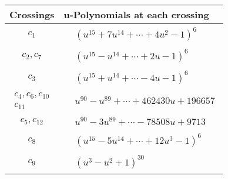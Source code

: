 \documentclass[1p]{elsarticle_modified}
\theoremstyle{definition}
\begin{document}
\begin{tabular}{m{50pt}|m{274pt}}
Crossings & \hspace{64pt}u-Polynomials at each crossing \\
\hline $$\begin{aligned}c_{1}\end{aligned}$$&$\begin{aligned}
&(u^{15}+7 u^{14}+\cdots+4 u^2-1)^{6}
\end{aligned}$\\
\hline $$\begin{aligned}c_{2},c_{7}\end{aligned}$$&$\begin{aligned}
&(u^{15}- u^{14}+\cdots+2 u-1)^{6}
\end{aligned}$\\
\hline $$\begin{aligned}c_{3}\end{aligned}$$&$\begin{aligned}
&(u^{15}+u^{14}+\cdots-4 u-1)^{6}
\end{aligned}$\\
\hline $$\begin{aligned}c_{4},c_{6},c_{10}\\c_{11}\end{aligned}$$&$\begin{aligned}
&u^{90}- u^{89}+\cdots+462430 u+196657
\end{aligned}$\\
\hline $$\begin{aligned}c_{5},c_{12}\end{aligned}$$&$\begin{aligned}
&u^{90}-3 u^{89}+\cdots-78508 u+9713
\end{aligned}$\\
\hline $$\begin{aligned}c_{8}\end{aligned}$$&$\begin{aligned}
&(u^{15}-5 u^{14}+\cdots+12 u^3-1)^{6}
\end{aligned}$\\
\hline $$\begin{aligned}c_{9}\end{aligned}$$&$\begin{aligned}
&(u^3- u^2+1)^{30}
\end{aligned}$\\
\hline
\end{tabular}\\~\\
\end{document}
